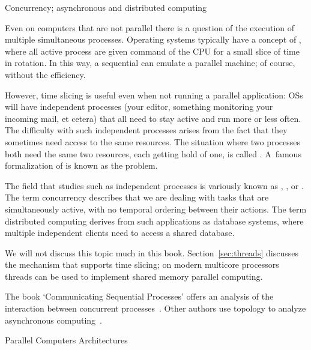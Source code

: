 
 {Concurrency; asynchronous and distributed computing}

Even on computers that are not parallel there is a question of the
execution of multiple simultaneous processes. Operating systems
typically have a concept of , where all active
process are given command of the \ac{CPU} for a small slice of time in
rotation. In this way, a sequential can emulate a parallel machine; of
course, without the efficiency.

However, time slicing is useful even when not running a parallel
application: \acp{OS} will have independent processes (your editor,
something monitoring your incoming mail, et cetera) that all need to
stay active and run more or less often. The difficulty with such
independent processes arises from the fact that they sometimes need
access to the same resources. The situation where two processes both
need the same two resources, each getting hold of one, is called
. A~famous formalization of
 is
known as the  problem.

The field that studies such as independent processes is variously
known as
,
, or
.
The term concurrency describes that we are dealing with tasks that are
simultaneously active, with no temporal ordering between their actions.
The term distributed computing derives from
such applications as database systems, where multiple independent clients need to
access a shared database. 

We will not discuss this topic much in this
book. Section~\ref{sec:threads} discusses the 
mechanism that supports time slicing; on modern multicore processors
threads can be used to implement shared memory parallel computing.

The book `Communicating Sequential
Processes' offers an analysis of the interaction between
concurrent processes~\cite{Hoare:CSP}. Other authors use topology to analyze
asynchronous computing~\cite{Herlihy:1999:topological}.

 {Parallel Computers Architectures}


